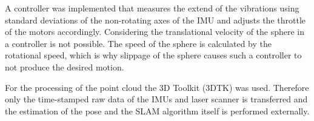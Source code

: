 A controller was implemented that measures the extend of the vibrations using standard deviations of the non-rotating axes of the IMU and adjusts the throttle of the motors accordingly.
Considering the translational velocity of the sphere in a controller is not possible.
The speed of the sphere is calculated by the rotational speed, which is why slippage of the sphere causes such a controller to not produce the desired motion. 

For the processing of the point cloud the 3D Toolkit (3DTK) was used.
Therefore only the time-stamped raw data of the IMUs and laser scanner is transferred and the estimation of the pose and the SLAM algorithm itself is performed externally.

